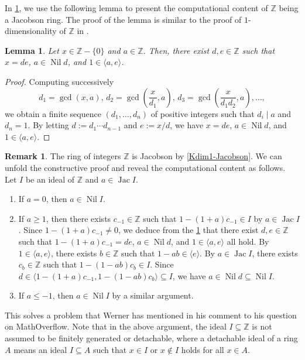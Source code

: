 \documentclass[11pt]{article}
\newtheorem{lemma}{Lemma}[section]
\theoremstyle{definition}
\newtheorem{remark}{Remark}[section]
\newcommand\gen[1]{\langle{#1}\rangle}
\newcommand\Z{\mathbb{Z}}
\DeclareMathOperator{\Nil}{Nil}
\DeclareMathOperator{\Jac}{Jac}
\begin{document}
In \cref{Z-is-Jacobson}, we use the following lemma to present the computational content of $\Z$ being a Jacobson ring.
The proof of the lemma is similar to the proof of $1$-dimensionality of $\Z$ in \cite[Examples 86]{Yen15}.
\begin{lemma}\label{Z-is-Jacobson-lemma}
    Let $x\in\Z-\{0\}$ and $a\in\Z$. Then, there exist $d,e\in\Z$ such that $x=de$, $a\in\Nil d$, and $1\in\gen{a,e}$.
\end{lemma}
\begin{proof}
    Computing successively \[d_1=\gcd(x,a),\,d_2=\gcd(\frac{x}{d_1},a),\,d_3=\gcd(\frac{x}{d_1d_2},a),\ldots,
    \]we obtain a finite sequence $(d_1,\dots,d_n)$ of positive integers such that $d_i\mid a$ and $d_n=1$.
    By letting $d:=d_1\cdots d_{n-1}$ and $e:=x/d$, we have $x=de$, $a\in\Nil d$, and $1\in\gen{a,e}$.
\end{proof}
\begin{remark}\label{Z-is-Jacobson}
    The ring of integers $\Z$ is Jacobson by \cref{Kdim1-Jacobson}. We can unfold the constructive proof and reveal the computational content as follows.
    Let $I$ be an ideal of $\Z$ and $a\in\Jac I$.
    \begin{enumerate}
        \item If $a=0$, then $a\in\Nil I$.
        \item If $a\ge1$, then there exists $c_{-1}\in\Z$ such that $1-(1+a)c_{-1}\in I$ by $a\in\Jac I$. Since $1-(1+a)c_{-1}\ne0$, we deduce from the \cref{Z-is-Jacobson-lemma} that there exist $d,e\in\Z$ such that $1-(1+a)c_{-1}=de$, $a\in\Nil d$, and $1\in\gen{a,e}$ all hold. By $1\in\gen{a,e}$, there exists $b\in\Z$ such that $1-ab\in\gen e$. By $a\in\Jac I$, there exists $c_b\in\Z$ such that $1-(1-ab)c_b\in I$. Since $d\in\gen{1-(1+a)c_{-1},1-(1-ab)c_b}\subseteq I$, we have $a\in\Nil d\subseteq\Nil I$.
        \item If $a\le-1$, then $a\in\Nil I$ by a similar argument.
    \end{enumerate}
    This solves a problem that Werner has mentioned in his comment to his question \cite{Wer17} on MathOverflow.
    Note that in the above argument, the ideal $I\subseteq\Z$ is not assumed to be finitely generated or detachable, where a detachable ideal of a ring $A$ means an ideal $I\subseteq A$ such that $x\in I$ or $x\notin I$ holds for all $x\in A$.
\end{remark}
\end{document}
